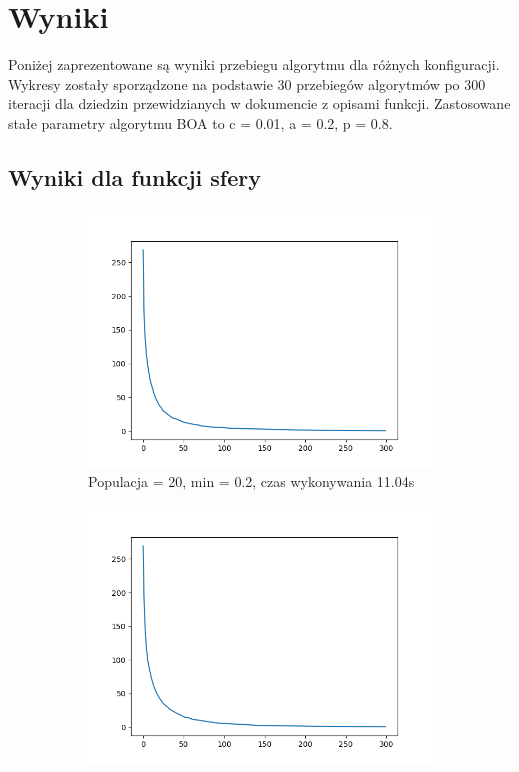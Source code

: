 \documentclass[12pt]{article}
\begin{document}
\section{Wyniki}
Poniżej zaprezentowane są wyniki przebiegu algorytmu dla różnych konfiguracji. Wykresy zostały sporządzone na podstawie 30 przebiegów algorytmów po 300 iteracji dla dziedzin przewidzianych w dokumencie z opisami funkcji. Zastosowane stałe parametry algorytmu BOA to c = 0.01, a = 0.2, p = 0.8.

\subsection{Wyniki dla funkcji sfery}
\begin{figure}[H]
    \centering
    \begin{subfigure}{0.32\textwidth}
        \centering
        \includegraphics[width=\linewidth]{plots/s1.png}
        \caption{Populacja = 20, min = 0.2, czas wykonywania 11.04s}
    \end{subfigure}
    \begin{subfigure}{0.32\textwidth}
        \centering
        \includegraphics[width=\linewidth]{plots/s2.png}

\end{subfigure}
\end{figure}
\end{document}
